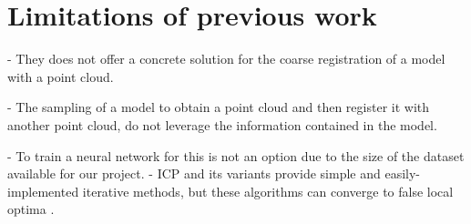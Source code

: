    \section{Limitations of previous work}
        - They does not offer a concrete solution for the coarse registration of a model with a point cloud. \par
        - The sampling of a model to obtain a point cloud and then register it with another point cloud, do not leverage the information contained in the model. \par
        - To train a neural network for this is not an option due to the size of the dataset available for our project.
        - ICP and its variants provide simple and easily-implemented iterative methods, but these
        algorithms can converge to false local optima \cite{Wang_2019_deepclosest}.



